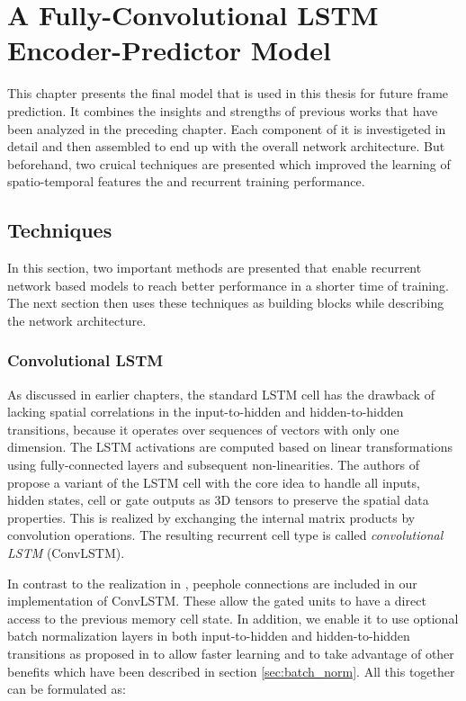 
\chapter{A Fully-Convolutional LSTM Encoder-Predictor Model} \label{chapter:implementation}

This chapter presents the final model that is used in this thesis for future frame prediction. It combines the insights and strengths of previous works that have been analyzed in the preceding chapter. Each component of it is investigeted in detail and then assembled to end up with the overall network architecture. But beforehand, two cruical techniques are presented which improved the learning of spatio-temporal features the and recurrent training performance.

\section{Techniques}

In this section, two important methods are presented that enable recurrent network based models to reach better performance in a shorter time of training. The next section then uses these techniques as building blocks while describing the network architecture.

\subsection{Convolutional LSTM} \label{sec:conv_lstm}

As discussed in earlier chapters, the standard LSTM cell has the drawback of lacking spatial correlations in the input-to-hidden and hidden-to-hidden transitions, because it operates over sequences of vectors with only one dimension. The LSTM activations are computed based on linear transformations using fully-connected layers and subsequent non-linearities. The authors of \parencite{conv_lstm_nowcasting} propose a variant of the LSTM cell with the core idea to handle all inputs, hidden states, cell or gate outputs as 3D tensors to preserve the spatial data properties. This is realized by exchanging the internal matrix products by convolution operations. The resulting recurrent cell type is called \textit{convolutional LSTM} (ConvLSTM).

In contrast to the realization in \parencite{spat_temp_video_autoenc}, peephole connections are included in our implementation of ConvLSTM. These allow the gated units to have a direct access to the previous memory cell state. In addition, we enable it to use optional batch normalization layers in both input-to-hidden and hidden-to-hidden transitions as proposed in \parencite{rnn-batchnorm} to allow faster learning and to take advantage of other benefits which have been described in section \ref{sec:batch_norm}. All this together can be formulated as:

